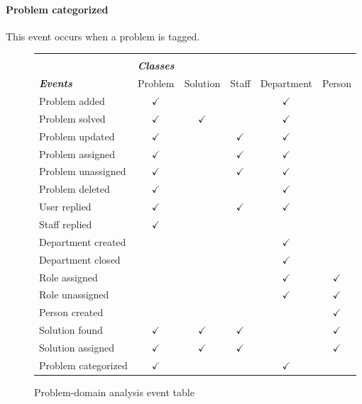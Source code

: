 \paragraph{Problem categorized}
This event occurs when a problem is tagged.


\begin{figure}[]
\begin{tabular}{ l c c c c c} \hline
\\
&\emph{\textbf{Classes}} &  &  & &  \\ 
\emph{\textbf{Events}} & Problem & Solution & Staff & Department & Person \\ \hline
 Problem added 				& $ \checkmark $ &  &  & $ \checkmark $ &  \\ 
 Problem solved 			& $ \checkmark $ & $ \checkmark $ &  & $ \checkmark $ &  \\ 
 Problem updated 			& $ \checkmark $ &  & $ \checkmark $ & $ \checkmark $ &  \\ 
 Problem assigned 		& $ \checkmark $ &  & $ \checkmark $ & $ \checkmark $ &  \\ 
 Problem unassigned 	& $ \checkmark $ &  & $ \checkmark $ & $ \checkmark $ &  \\ 
 Problem deleted 			& $ \checkmark $ &  &  & $ \checkmark $ &  \\ 
 User replied 				& $ \checkmark $ &  & $ \checkmark $ & $ \checkmark $ &  \\ 
 Staff replied 				& $ \checkmark $ &  &  &  &  \\ 
 Department created 	&  &  &  & $ \checkmark $ &  \\ 
 Department closed 		&  &  &  & $ \checkmark $ &  \\ 
 Role assigned 				&  &  &  & $ \checkmark $ & $ \checkmark $  \\ 
 Role unassigned 			&  &  &  &  $ \checkmark $  & $ \checkmark $ \\ 
 Person created 			&  &  &  &  & $ \checkmark $ \\ 
 Solution found 			& $ \checkmark $ & $ \checkmark $ & $ \checkmark $ &  & $ \checkmark $ \\ 
 Solution assigned		& $ \checkmark $ & $ \checkmark $ & $ \checkmark $ &  & $ \checkmark $ \\ 
 Problem categorized	& $ \checkmark $ &  &  & $ \checkmark $ &  \\ \hline
\end{tabular}
\caption{Problem-domain analysis event table}
\label{fig:classeseventstable}
\end{figure}

